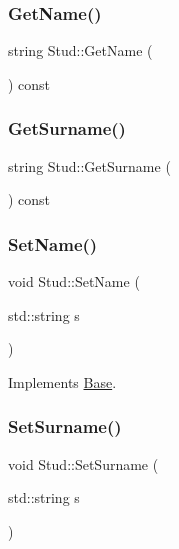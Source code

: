 \subsubsection{\texorpdfstring{GetName()}{GetName()}}
{\footnotesize\ttfamily string Stud\+::\+Get\+Name (\begin{DoxyParamCaption}{ }\end{DoxyParamCaption}) const}

\mbox{\label{class_stud_a832e44b522edd983fde7f6f6b78080f5}} 
\subsubsection{\texorpdfstring{GetSurname()}{GetSurname()}}
{\footnotesize\ttfamily string Stud\+::\+Get\+Surname (\begin{DoxyParamCaption}{ }\end{DoxyParamCaption}) const}

\mbox{\label{class_stud_a47072e741fc0f089a5412e0a0b74c2a2}} 
\subsubsection{\texorpdfstring{SetName()}{SetName()}}
{\footnotesize\ttfamily void Stud\+::\+Set\+Name (\begin{DoxyParamCaption}\item[{std\+::string}]{s }\end{DoxyParamCaption})\hspace{0.3cm}{\ttfamily [virtual]}}



Implements \mbox{\hyperlink{class_base_a36e77d06849030aa9610fedeef0cbf90}{Base}}.

\mbox{\label{class_stud_aaf24cd5a22fea522b6f9da7e3a994d99}} 
\subsubsection{\texorpdfstring{SetSurname()}{SetSurname()}}
{\footnotesize\ttfamily void Stud\+::\+Set\+Surname (\begin{DoxyParamCaption}\item[{std\+::string}]{s }\end{DoxyParamCaption})\hspace{0.3cm}{\ttfamily [virtual]}}



